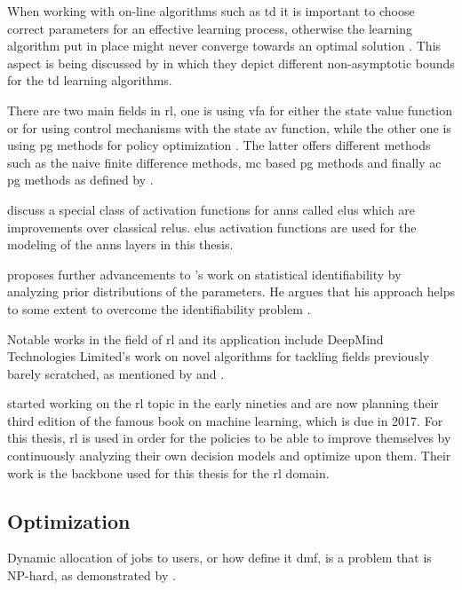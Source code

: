 \documentclass[draft=false]{seal_thesis}
\begin{document}
When working with on-line algorithms such as \gls{td} it is important to choose correct parameters for an effective learning process, otherwise the learning algorithm put in place might never converge towards an optimal solution \citep{Sutton2017}. This aspect is being discussed by \citet{Korda2014} in which they depict different non-asymptotic bounds for the \gls{td} learning algorithms.

There are two main fields in \gls{rl}, one is using \gls{vfa} for either the state value function or for using control mechanisms with the state \gls{av} function, while the other one is using \gls{pg} methods for policy optimization \citep{Sutton2017}. The latter offers different methods such as the naive finite difference methods, \gls{mc} based \gls{pg} methods and finally \gls{ac} \gls{pg} methods as defined by \citet{Silver2014}.

\citet{Clevert2015} discuss a special class of activation functions for \glspl{ann} called \glspl{elu} which are improvements over classical \glspl{relu}. \glspl{elu} activation functions are used for the modeling of the \glspl{ann} layers in this thesis.

\citet{Gershman2016} proposes further advancements to \citet{Zhang2011}'s work on statistical identifiability by analyzing prior distributions of the parameters. He argues that his approach helps to some extent to overcome the identifiability problem \citep{Gershman2016}.

Notable works in the field of \gls{rl} and its application include DeepMind Technologies Limited's work on novel algorithms for tackling fields previously barely scratched, as mentioned by \citet{Mnih2015} and \citet{Silver2016}.

\citet{Sutton2017} started working on the \gls{rl} topic in the early nineties and are now planning their third edition of the famous book on machine learning, which is due in 2017. For this thesis, \gls{rl} is used in order for the policies to be able to improve themselves by continuously analyzing their own decision models and optimize upon them. Their work is the backbone used for this thesis for the \gls{rl} domain.

\subsection{Optimization}

Dynamic allocation of jobs to users, or how \citet{Zeng2005} define it \ie \gls{dmf}, is a problem that is NP-hard, as demonstrated by \citet{Garey1990}.
\end{document}
